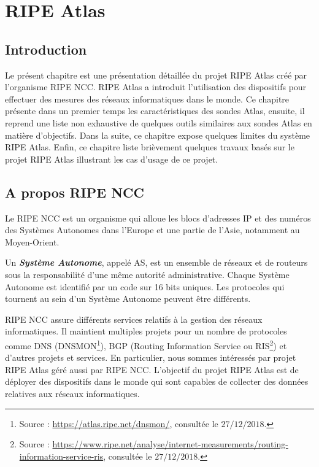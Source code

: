 
\chapter{RIPE Atlas}

\section{Introduction}



Le présent chapitre est une présentation détaillée du projet RIPE Atlas créé par l'organisme RIPE NCC.  RIPE Atlas  a introduit l'utilisation des dispositifs pour  effectuer des mesures des réseaux informatiques dans le monde. Ce chapitre présente dans un premier temps les caractéristiques des sondes Atlas, ensuite, il  reprend une liste non exhaustive  de quelques outils similaires aux sondes Atlas en matière d'objectifs. Dans la suite, ce chapitre expose quelques limites du système RIPE Atlas. Enfin, ce chapitre  liste  brièvement quelques travaux basés sur le projet RIPE Atlas illustrant les cas d'usage de ce projet.


\section{A propos RIPE NCC}
Le RIPE NCC  est un organisme qui alloue les blocs d'adresses IP et des numéros des Systèmes Autonomes dans l'Europe et une partie de l'Asie, notamment au Moyen-Orient. 

\begin{tcolorbox}
	Un\textit{ \textbf{Système Autonome}}, appelé AS, est un ensemble de réseaux et de routeurs sous la responsabilité d'une même autorité administrative. Chaque Système Autonome est identifié par un code sur 16 bits uniques. Les protocoles qui tournent au sein d'un Système Autonome peuvent être différents.
\end{tcolorbox}

RIPE NCC assure différents services relatifs à la gestion des réseaux informatiques. Il maintient multiples projets  pour un nombre de protocoles comme DNS (DNSMON\footnote{Source : \url{https://atlas.ripe.net/dnsmon/}, consultée le $27/12/2018$.}), BGP (Routing Information Service ou RIS\footnote{Source : \url{https://www.ripe.net/analyse/internet-measurements/routing-information-service-ris}, consultée le $27/12/2018$.}) et d'autres projets et services. En particulier, nous sommes intéressés  par projet RIPE Atlas géré aussi par RIPE NCC. L'objectif du projet RIPE Atlas est de déployer des dispositifs dans le monde qui sont capables de collecter des données relatives aux réseaux informatiques. %


